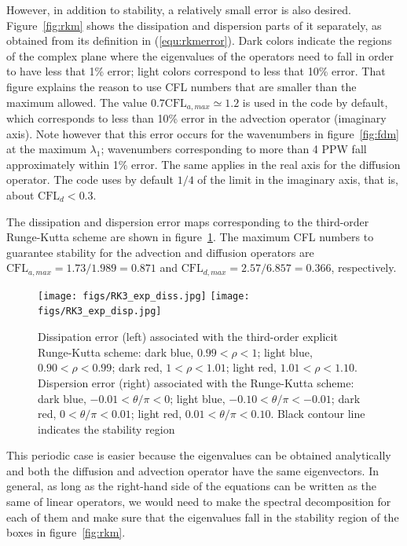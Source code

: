 {However, in addition to stability, a relatively small error is also
desired. Figure~\ref{fig:rkm} shows the dissipation and dispersion parts of it
separately, as obtained from its definition in (\ref{equ:rkmerror}). Dark colors
indicate the regions of the complex plane where the eigenvalues of the operators
need to fall in order to have less that 1\% error; light colors correspond to
less that 10\% error. That figure explains the reason to use CFL numbers that
are smaller than the maximum allowed. The value $0.7\textrm{CFL}_{a,max}\simeq
1.2$ is used in the code by default, which corresponds to less than 10\% error
in the advection operator (imaginary axis). Note however that this error occurs
for the wavenumbers in figure~\ref{fig:fdm} at the maximum $\lambda_1$;
wavenumbers corresponding to more than 4 PPW fall approximately within 1\%
error. The same applies in the real axis for the diffusion operator. The code
uses by default $1/4$ of the limit in the imaginary axis, that is, about
$\textrm{CFL}_{d}<0.3$.

The dissipation and dispersion error maps corresponding to the third-order
Runge-Kutta scheme are shown in figure~\ref{fig:rkm3}. The maximum CFL numbers
to guarantee stability for the advection and diffusion operators are
$\textrm{CFL}_{a,max} = 1.73/1.989=0.871$ and $\textrm{CFL}_{d,max} =
2.57/6.857=0.366$, respectively.

\begin{figure}
\texttt{[image: figs/RK3\_exp\_diss.jpg]}\hfill
\texttt{[image: figs/RK3\_exp\_disp.jpg]}
\caption{Dissipation error (left) associated with the third-order explicit
  Runge-Kutta scheme: dark blue, $0.99<\rho<1$; light blue, $0.90<\rho<0.99$;
  dark red, $1<\rho<1.01$; light red, $1.01<\rho<1.10$. Dispersion error (right)
  associated with the Runge-Kutta scheme: dark blue, $-0.01<\theta/\pi<0$; light
  blue, $-0.10<\theta/\pi<-0.01$; dark red, $0<\theta/\pi<0.01$; light red,
  $0.01<\theta/\pi<0.10$. Black contour line indicates the stability
  region}\label{fig:rkm3}
\end{figure}

This periodic case is easier because the eigenvalues can be obtained
analytically and both the diffusion and advection operator have the same
eigenvectors. In general, as long as the right-hand side of the equations can be
written as the same of linear operators, we would need to make the spectral
decomposition for each of them and make sure that the eigenvalues fall in the
stability region of the boxes in figure~\ref{fig:rkm}.

}
